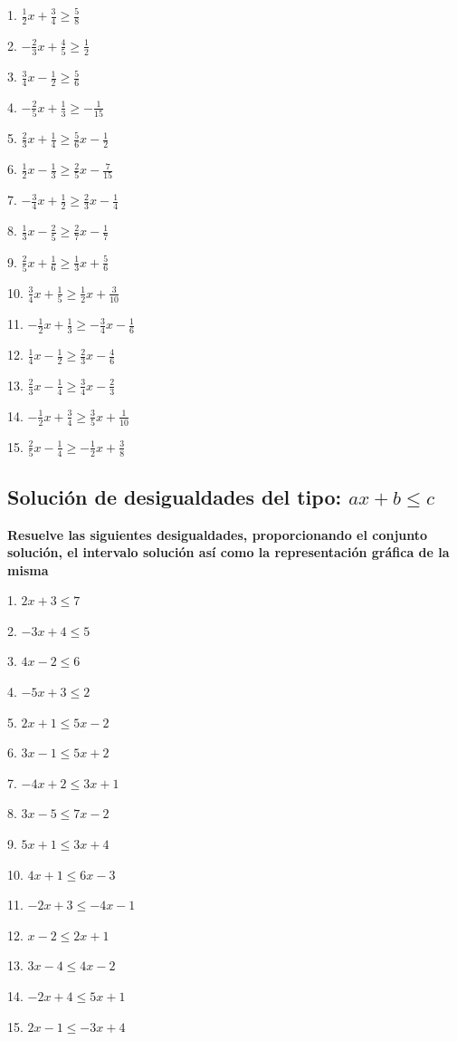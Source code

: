 \documentclass[]{book}
\begin{document}
\begin{multicols}{3}
1. $\frac{1}{2}x + \frac{3}{4} \geq \frac{5}{8}$

2. $-\frac{2}{3}x + \frac{4}{5} \geq \frac{1}{2}$

3. $\frac{3}{4}x - \frac{1}{2} \geq \frac{5}{6}$

4. $-\frac{2}{5}x + \frac{1}{3} \geq -\frac{1}{15}$

5. $\frac{2}{3}x + \frac{1}{4} \geq \frac{5}{6}x - \frac{1}{2}$

6. $\frac{1}{2}x - \frac{1}{3} \geq \frac{2}{5}x - \frac{7}{15}$

7. $-\frac{3}{4}x + \frac{1}{2} \geq \frac{2}{3}x - \frac{1}{4}$

8. $\frac{1}{3}x - \frac{2}{5} \geq \frac{2}{7}x - \frac{1}{7}$

9. $\frac{2}{5}x + \frac{1}{6} \geq \frac{1}{3}x + \frac{5}{6}$

10. $\frac{3}{4}x + \frac{1}{5} \geq \frac{1}{2}x + \frac{3}{10}$

11. $-\frac{1}{2}x + \frac{1}{3} \geq -\frac{3}{4}x - \frac{1}{6}$

12. $\frac{1}{4}x - \frac{1}{2} \geq \frac{2}{3}x - \frac{4}{6}$

13. $\frac{2}{3}x - \frac{1}{4} \geq \frac{3}{4}x - \frac{2}{3}$

14. $-\frac{1}{2}x + \frac{3}{4} \geq \frac{3}{5}x + \frac{1}{10}$

15. $\frac{2}{5}x - \frac{1}{4} \geq -\frac{1}{2}x + \frac{3}{8}$
\end{multicols}

\subsection{\texorpdfstring{Solución de desigualdades del tipo:
\(ax+b \leq c\)}{Solución de desigualdades del tipo: ax+b \textbackslash{}leq c}}\label{soluciuxf3n-de-desigualdades-del-tipo-axb-leq-c}

\textbf{Resuelve las siguientes desigualdades, proporcionando el
conjunto solución, el intervalo solución así como la representación
gráfica de la misma}

\begin{multicols}{3}
1. $2x + 3 \leq 7$

2. $-3x + 4 \leq 5$

3. $4x - 2 \leq 6$

4. $-5x + 3 \leq 2$

5. $2x + 1 \leq 5x - 2$

6. $3x - 1 \leq 5x + 2$

7. $-4x + 2 \leq 3x + 1$

8. $3x - 5 \leq 7x - 2$

9. $5x + 1 \leq 3x + 4$

10. $4x + 1 \leq 6x - 3$

11. $-2x + 3 \leq -4x - 1$

12. $x - 2 \leq 2x + 1$

13. $3x - 4 \leq 4x - 2$

14. $-2x + 4 \leq 5x + 1$

15. $2x - 1 \leq -3x + 4$
\end{multicols}
\end{document}

